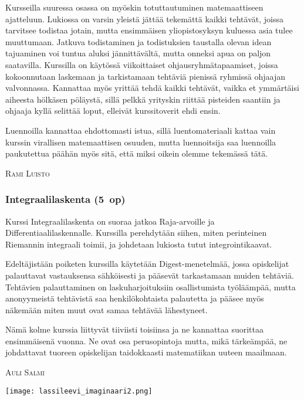 \documentclass[../ala_hataile.tex]{subfiles}
\begin{document}
	Kursseilla suuressa osassa on myöskin
	totuttautuminen matemaattiseen ajatteluun.
	Lukiossa on varsin yleistä jättää tekemättä
	kaikki tehtävät, joissa tarvitsee todistaa
	jotain, mutta ensimmäisen yliopistosyksyn
	kuluessa asia tulee muuttumaan. Jatkuva
	todistaminen ja todistuksien taustalla
	olevan idean tajuaminen voi tuntua aluksi
	jännittävältä, mutta onneksi apua on paljon
	saatavilla. Kurssilla on käytössä
	viikoittaiset ohjaus\-ryhmä\-tapaamiset, joissa
	kokoonnutaan laskemaan ja tarkistamaan tehtäviä
	pienissä ryhmissä ohjaajan valvonnassa. Kannattaa
	myös yrittää tehdä kaikki tehtävät, vaikka et 
	ymmärtäisi aiheesta hölkäsen pöläystä,
	sillä pelkkä yrityskin riittää pisteiden saantiin
	ja ohjaaja kyllä selittää loput, elleivät kurssitoverit
	ehdi ensin.
	
	Luennoilla kannattaa ehdottomasti istua,
	sillä luentomateriaali kattaa vain kurssin
	virallisen matemaattisen osuuden, mutta
	luennoitsija saa luennoilla paukutettua päähän
	myös sitä, että miksi oikein olemme
	tekemässä tätä.
	
	\vspace{0.5cm}
	\noindent\textsc{Rami Luisto}
	
	\subsubsection*{Integraalilaskenta (5~op)}
	Kurssi Integraalilaskenta on suoraa jatkoa Raja-arvoille ja Differentiaali\-laskennalle. Kurssilla perehdytään siihen, miten perinteinen Riemannin integraali toimii, ja johdetaan lukiosta tutut integrointi\-kaavat.
	
	Edeltäjistään poiketen kurssilla käytetään Digest-menetelmää, jossa opiskelijat palauttavat vastauksensa sähköisesti ja pääsevät tarkastamaan muiden tehtäviä. Tehtävien palauttaminen on laskuharjoituksiin osallistumista työläämpää, mutta anonyymeistä tehtävistä saa henkilökohtaista palautetta ja pääsee myös näkemään miten muut ovat samaa tehtävää lähestyneet. 
	
	Nämä kolme kurssia liittyvät tiiviisti toisiinsa
	ja ne kannattaa suorittaa ensimmäisenä
	vuonna. Ne ovat osa perusopintoja
	mutta, mikä tärkeämpää, ne johdattavat
	tuoreen opiskelijan taidokkaasti matematiikan
	uuteen maailmaan.
	
	\vspace{0.5cm}
	\noindent\textsc{Auli Salmi}
	
	\begin{figure*}[!b]
		\centering
		\texttt{[image: lassileevi\_imaginaari2.png]}
	\end{figure*}
	
\end{document}

